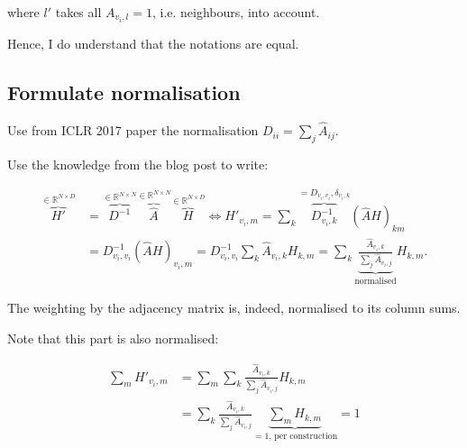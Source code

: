 \documentclass[]{article}
\begin{document}
where $l'$ takes all $A_{v_i,l}=1$, i.e. neighbours, into account.

Hence, I do understand that the notations are equal.

\subsection{Formulate normalisation}

Use from ICLR 2017 paper the normalisation $D_{ii} = \sum_j \hat{A}_{ij}$.

Use the knowledge from the blog post to write:

\begin{equation}
	\begin{split}
		\overbrace{H'}^{\in \mathbb{R}^{N\times D}} 
			& = \overbrace{D^{-1}}^{\in\mathbb{R}^{N\times N}} \overbrace{\hat{A}}^{\in \mathbb{R}^{N\times N}} \overbrace{H}^{\in\mathbb{R}^{N\times D}}
			\Leftrightarrow H'_{v_i, m} = \sum_k \overbrace{D^{-1}_{v_i,k}}^{=D_{v_i,v_i}, \delta_{v_i, k}} (\hat{A} H)_{km} \\
		& = D^{-1}_{v_i, v_i} (\hat{A} H)_{v_i, m} = D^{-1}_{v_i, v_i} \sum_k \hat{A}_{v_i, k} H_{k, m} = \sum_k \underbrace{\frac{\hat{A}_{v_i, k}}{\sum_j \hat{A}_{v_i, j}}}_{\text{normalised}} H_{k, m}.
	\end{split}
\end{equation}

The weighting by the adjacency matrix is, indeed, normalised to its column sums.

Note that this part is also normalised:

\begin{equation}
\begin{split}
	\sum_m H'_{v_i, m} & = \sum_m \sum_k \frac{\hat{A}_{v_i, k}}{\sum_j \hat{A}_{v_i, j}} H_{k, m} \\
	& = \sum_k \frac{\hat{A}_{v_i, k}}{\sum_j \hat{A}_{v_i, j}} \underbrace{\sum_m H_{k,m}}_{=1\text{, per construction}} = 1
\end{split}
\end{equation}

\printbibliography{}
\end{document}

